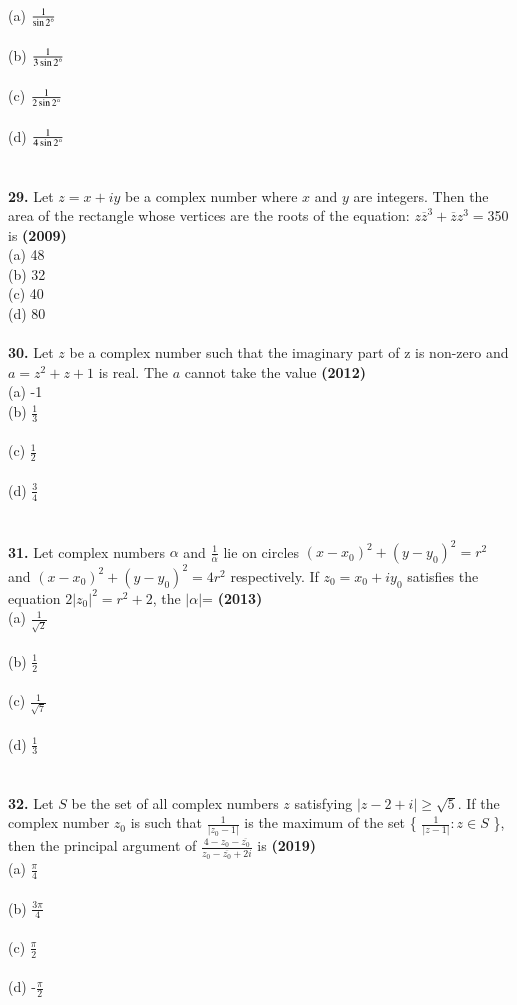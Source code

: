 \documentclass[journal,12pt,twocolumn]{IEEEtran}
\theoremstyle{remark}
\begin{document}
(a) $\frac{1}{\sin 2\degree}$\\\\
(b) $\frac{1}{3\sin 2\degree}$\\\\
(c) $\frac{1}{2\sin 2\degree}$\\\\
(d) $\frac{1}{4\sin 2\degree}$\\\\
\\
\textbf{29.} Let $z=x+iy$ be a complex number where $x$ and $y$ are integers. Then the area of the rectangle whose vertices are the roots of the equation: $z\overline{z}^{3}+\overline{z}z^{3}=$350 is \textbf{(2009)}\\
(a) 48\\
(b) 32\\
(c) 40\\
(d) 80\\
\\
\textbf{30.} Let $z$ be a complex number such that the imaginary part of z is non-zero and $a=z^{2}+z+1$ is real. The $a$ cannot take the value \textbf{(2012)}\\
(a) -1\\
(b) $\frac{1}{3}$\\\\
(c) $\frac{1}{2}$\\\\
(d) $\frac{3}{4}$\\\\
\\
\textbf{31.} Let complex numbers $\alpha$ and $\frac{1}{\overline{\alpha}}$ lie on circles $(x-x_{0})^{2}+(y-y_{0})^{2}=r^{2}$ and $(x-x_{0})^{2}+(y-y_{0})^{2}=4r^{2}$ respectively. If $z_{0}=x_{0}+iy_{0}$ satisfies the equation $2|z_{0}| ^{2}=r^{2}+2$, the $|\alpha|$= \textbf{(2013)}\\
(a) $\frac{1}{\sqrt{2}}$\\\\
(b) $\frac{1}{2}$\\\\
(c) $\frac{1}{\sqrt{7}}$\\\\
(d) $\frac{1}{3}$\\\\
\\
\textbf{32.} Let $S$ be the set of all complex numbers $z$ satisfying $|z-2+i|\geq\sqrt{5}$. If the complex number $z_{0}$ is such that $\frac{1}{|z_{0}-1|}$ is the maximum of the set \{ $\frac{1}{|z-1|} : z \in S$ \}, then the principal argument of $\frac{4-z_{0}-\overline{z_{0}}}{z_{0}-\overline{z_{0}}+2i}$ is  \textbf{(2019)}\\
(a) $\frac{\pi}{4}$\\\\
(b) $\frac{3\pi}{4}$\\\\
(c) $\frac{\pi}{2}$\\\\
(d) -$\frac{\pi}{2}$\\\\
\\
\end{document}
